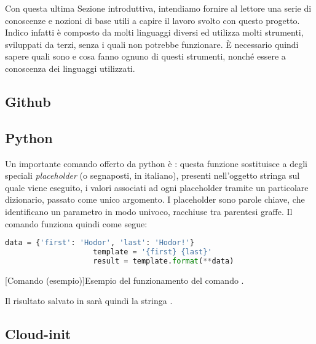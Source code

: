         Con questa ultima Sezione introduttiva, intendiamo fornire al lettore una serie di conoscenze e nozioni di base utili a capire il lavoro svolto con questo progetto. Indico infatti è composto da molti linguaggi diversi ed utilizza molti strumenti, sviluppati da terzi, senza i quali non potrebbe funzionare. È necessario quindi sapere quali sono e cosa fanno ognuno di questi strumenti, nonché essere a conoscenza dei linguaggi utilizzati.
        
        \subsection{Github} \label{subsec:p;sl;github}
    
        \subsection{Python} \label{subsec:p;sl;python}
        
            Un importante comando offerto da python è : questa funzione sostituisce a degli speciali \textit{placeholder} (o segnaposti, in italiano), presenti nell'oggetto stringa sul quale viene eseguito, i valori associati ad ogni placeholder tramite un particolare dizionario, passato come unico argomento. I placeholder sono parole chiave, che identificano un parametro in modo univoco, racchiuse tra parentesi graffe. Il comando  funziona quindi come segue:
            
            \begin{center}
                \begin{lstlisting}[language=python, gobble=18]
                    data = {'first': 'Hodor', 'last': 'Hodor!'}
                    template = '{first} {last}'
                    result = template.format(**data)
                \end{lstlisting}
                \captionsetup{textformat=empty,labelformat=empty} \vspace{-2em}
                [Comando  (esempio)]{Esempio del funzionamento del comando .}
            \end{center}
            
            Il risultato salvato in  sarà quindi la stringa .
        
        \subsection{Cloud-init} \label{subsec:p;sl;cloud-init}
        
